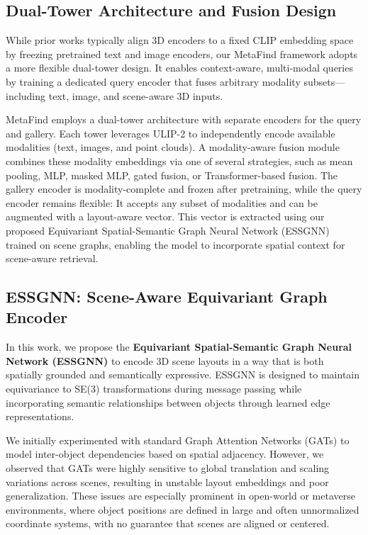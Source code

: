 \subsection{Dual-Tower Architecture and Fusion Design}
While prior works typically align 3D encoders to a fixed CLIP embedding space by freezing pretrained text and image encoders, our MetaFind framework adopts a more flexible dual-tower design. It enables context-aware, multi-modal queries by training a dedicated query encoder that fuses arbitrary modality subsets—including text, image, and scene-aware 3D inputs.

MetaFind employs a dual-tower architecture with separate encoders for the query and gallery. Each tower leverages ULIP-2 to independently encode available modalities (text, images, and point clouds). A modality-aware fusion module combines these modality embeddings via one of several strategies, such as mean pooling, MLP, masked MLP, gated fusion, or Transformer-based fusion. The gallery encoder is modality-complete and frozen after pretraining, while the query encoder remains flexible: It accepts any subset of modalities and can be augmented with a layout-aware vector. This vector is extracted using our proposed Equivariant Spatial-Semantic Graph Neural Network (ESSGNN) trained on scene graphs, enabling the model to incorporate spatial context for scene-aware retrieval.
\subsection{ESSGNN: Scene-Aware Equivariant Graph Encoder}
In this work, we propose the \textbf{Equivariant Spatial-Semantic Graph Neural Network (ESSGNN)} to encode 3D scene layouts in a way that is both spatially grounded and semantically expressive. ESSGNN is designed to maintain equivariance to SE(3) transformations during message passing while incorporating semantic relationships between objects through learned edge representations.

We initially experimented with standard Graph Attention Networks (GATs) to model inter-object dependencies based on spatial adjacency. However, we observed that GATs were highly sensitive to global translation and scaling variations across scenes, resulting in unstable layout embeddings and poor generalization. These issues are especially prominent in open-world or metaverse environments, where object positions are defined in large and often unnormalized coordinate systems, with no guarantee that scenes are aligned or centered.

